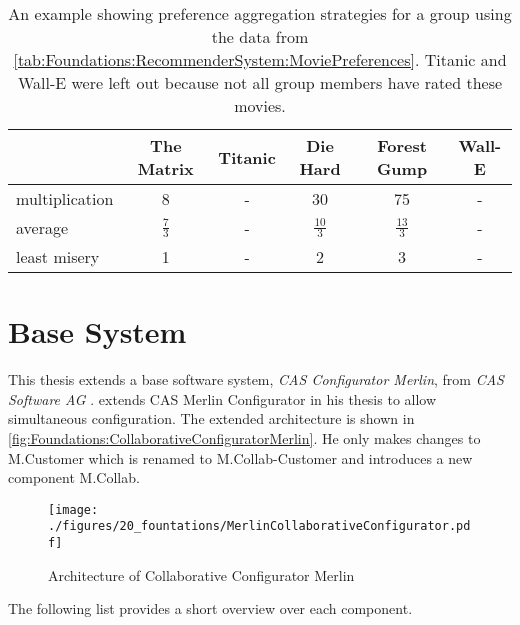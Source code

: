 \begin{table}
    \centering    
    \begin{tabular}{ l | c | c | c | c | c }
        & The Matrix & Titanic & Die Hard & Forest Gump & Wall-E \\ \hline
         multiplication  & 8 & - & 30 & 75 & - \\
         average  & $\frac{7}{3}$ & - & $\frac{10}{3}$ & $\frac{13}{3}$ & - \\
         least misery  & 1 & - & 2 & 3 & - \\
    \end{tabular}
    \caption{An example showing preference aggregation strategies for a group using the data from \autoref{tab:Foundations:RecommenderSystem:MoviePreferences}. Titanic and Wall-E were left out because not all group members have rated these movies.}
    
    \label{tab:Foundations:RecommenderSystem:AggregationStrategy}
\end{table}

\section{Base System}
\label{sec:Foundations:BaseSystem}

This thesis extends a base software system, \emph{CAS Configurator Merlin}, from \emph{CAS Software AG} \cite{CASSoftwareAG}. \citeauthor{raabKollaborativeProduktkonfigurationEchtzeit2019} \cite{raabKollaborativeProduktkonfigurationEchtzeit2019} extends CAS Merlin Configurator in his thesis to allow simultaneous configuration. The extended architecture is shown in \autoref{fig:Foundations:CollaborativeConfiguratorMerlin}.
He only makes changes to M.Customer which is renamed to M.Collab-Customer and introduces a new component M.Collab.

\begin{figure}
    \centering
    \texttt{[image: ./figures/20\_fountations/MerlinCollaborativeConfigurator.pdf]}
    \caption{Architecture of Collaborative Configurator Merlin \cite[Fig. 4.3]{raabKollaborativeProduktkonfigurationEchtzeit2019}}
    \label{fig:Foundations:CollaborativeConfiguratorMerlin}
\end{figure}

The following list provides a short overview over each component.

